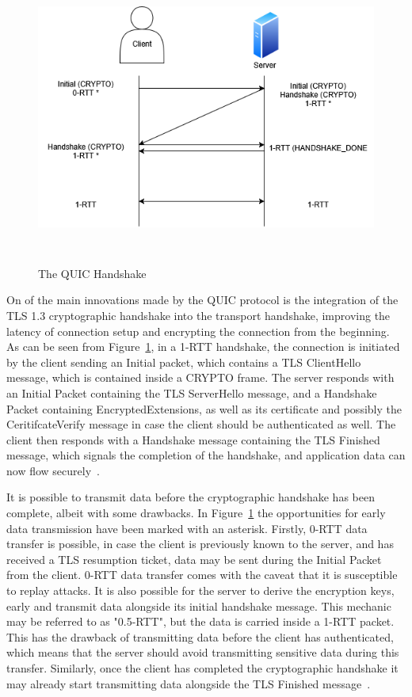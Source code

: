 \documentclass[english, 12pt, a4paper, elec, utf8, a-2b, online]{aaltothesis}
\begin{document}
\begin{figure}[h]
	\centering
	\includegraphics[alt={Diagram of QUIC handshake between a client and a server}, height=9cm]{./images/quic_handshake.png}
	\caption{The QUIC Handshake}
	\label{fig:quic_handshake}
\end{figure}

On of the main innovations made by the QUIC protocol is the integration of the
TLS 1.3 cryptographic handshake into the transport handshake, improving the latency
of connection setup and encrypting the connection from the beginning. As can be
seen from Figure~\ref{fig:quic_handshake}, in a 1-RTT handshake, the connection is initiated by the client
sending an Initial packet, which contains a TLS ClientHello message, which is
contained inside a CRYPTO frame. The server responds with an Initial Packet containing
the TLS ServerHello message, and a Handshake Packet containing EncryptedExtensions, as
well as its certificate and possibly the CeritifcateVerify message in case the client
should be authenticated as well. The client then responds with a Handshake message
containing the TLS Finished message, which signals the completion of the handshake,
and application data can now flow securely~\cite{rfc9000, rfc9001}.

It is possible to transmit data before the cryptographic handshake has been complete,
albeit with some drawbacks. In Figure~\ref{fig:quic_handshake} the opportunities
for early data transmission have been marked with an asterisk. Firstly, 0-RTT data
transfer is possible, in case the client is previously known to the server, and
has received a TLS resumption ticket, data may be sent during the Initial Packet
from the client. 0-RTT data transfer comes with the caveat that it is susceptible
to replay attacks. It is also possible for the server to derive the encryption keys,
early and transmit data alongside its initial handshake message. This mechanic may
be referred to as "0.5-RTT", but the data is carried inside a 1-RTT packet. This has
the drawback of transmitting data before the client has authenticated, which means
that the server should avoid transmitting sensitive data during this transfer. Similarly,
once the client has completed the cryptographic handshake it may already start
transmitting data alongside the TLS Finished message~\cite{rfc9000, rfc9001}.
\end{document}
